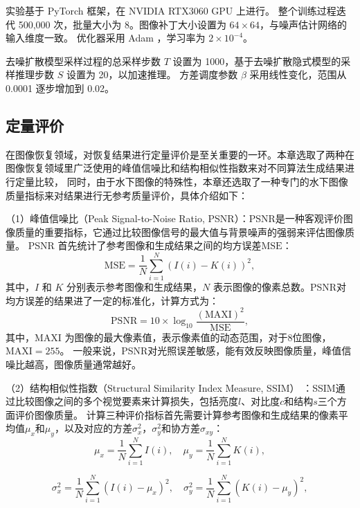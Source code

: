 实验基于 PyTorch 框架，在 NVIDIA RTX3060 GPU 上进行。
整个训练过程迭代 500,000 次，批量大小为 8。图像补丁大小设置为 $64 \times 64$，与噪声估计网络的输入维度一致。
优化器采用 Adam \cite{kingma2017adam}，学习率为 $2 \times 10^{-4}$。

去噪扩散模型采样过程的总采样步数 $T$ 设置为 1000，基于去噪扩散隐式模型的采样推理步数 $S$ 设置为 20，以加速推理。
方差调度参数 $\beta$ 采用线性变化，范围从 0.0001 逐步增加到 0.02。

\subsection{定量评价} \label{sec:quantitative}
在图像恢复领域，对恢复结果进行定量评价是至关重要的一环。本章选取了两种在图像恢复领域里广泛使用的峰值信噪比和结构相似性指数来对不同算法生成结果进行定量比较，
同时，由于水下图像的特殊性，本章还选取了一种专门的水下图像质量指标来对结果进行无参考质量评价，具体介绍如下：

（1）峰值信噪比（Peak Signal-to-Noise Ratio, PSNR）：PSNR是一种客观评价图像质量的重要指标，它通过比较图像信号的最大值与背景噪声的强弱来评估图像质量。
PSNR 首先统计了参考图像和生成结果之间的均方误差$\mathrm{MSE}$：
\begin{equation}
    \mathrm{MSE} = \frac{1}{N} \sum_{i=1}^{N} (I(i) - K(i))^2,
\end{equation}
其中，$I$ 和 $K$ 分别表示参考图像和生成结果，$N$ 表示图像的像素总数。PSNR对均方误差的结果进了一定的标准化，计算方式为：
\begin{equation}
    \mathrm{PSNR} =10 \times \log _{10} \frac{(\mathrm{MAXI})^2}{\mathrm{MSE}},
\end{equation}
其中，$\mathrm{MAXI}$ 为图像的最大像素值，表示像素值的动态范围，对于8位图像，$\mathrm{MAXI}=255$。
一般来说，PSNR对光照误差敏感，能有效反映图像质量，峰值信噪比越高，图像质量通常越好。

（2）结构相似性指数（Structural Similarity Index Measure, SSIM） \cite{ssim}：SSIM通过比较图像之间的多个视觉要素来计算损失，包括亮度$l$、对比度$c$和结构$s$三个方面评价图像质量。
计算三种评价指标首先需要计算参考图像和生成结果的像素平均值$\mu_x$和$\mu_y$，以及对应的方差$\sigma_x^2$，$\sigma_y^2$和协方差$\sigma_{xy}$：
\begin{equation}
    \mu_x = \frac{1}{N} \sum_{i=1}^{N} I(i) , \quad \mu_y = \frac{1}{N} \sum_{i=1}^{N} K(i),
\end{equation}

\begin{equation}
    \sigma_x^2 = \frac{1}{N} \sum_{i=1}^{N} (I(i) - \mu_x)^2 , \quad \sigma_y^2 = \frac{1}{N} \sum_{i=1}^{N} (K(i) - \mu_y)^2,
\end{equation}


